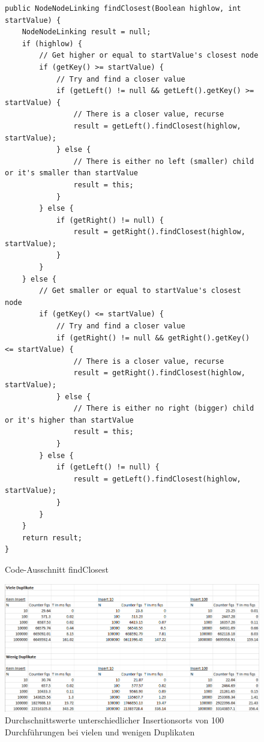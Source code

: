 \documentclass[11pt]{scrartcl}
\begin{document}
\begin{figure}
\begin{verbatim}
public NodeNodeLinking findClosest(Boolean highlow, int startValue) {
    NodeNodeLinking result = null;
    if (highlow) {
        // Get higher or equal to startValue's closest node
        if (getKey() >= startValue) {
            // Try and find a closer value
            if (getLeft() != null && getLeft().getKey() >= startValue) {
                // There is a closer value, recurse
                result = getLeft().findClosest(highlow, startValue);
            } else {
                // There is either no left (smaller) child or it's smaller than startValue
                result = this;
            }
        } else {
            if (getRight() != null) {
                result = getRight().findClosest(highlow, startValue);
            }
        }
    } else {
        // Get smaller or equal to startValue's closest node
        if (getKey() <= startValue) {
            // Try and find a closer value
            if (getRight() != null && getRight().getKey() <= startValue) {
                // There is a closer value, recurse
                result = getRight().findClosest(highlow, startValue);
            } else {
                // There is either no right (bigger) child or it's higher than startValue
                result = this;
            }
        } else {
            if (getLeft() != null) {
                result = getLeft().findClosest(highlow, startValue);
            }
        }
    }
    return result;
}
\end{verbatim}
\caption{Code-Ausschnitt findClosest}
\label{figure:findClosest}
\end{figure}

\begin{figure}
\includegraphics[width=\linewidth]{insertiontable.png}
\caption{Durchschnittswerte unterschiedlicher Insertionsorts von 100 Durchführungen bei vielen und wenigen Duplikaten}
\label{figure:table}
\end{figure}
\end{document}
